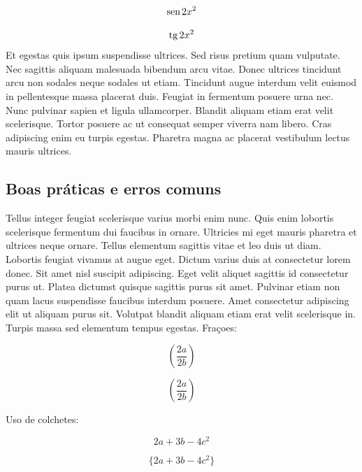 \documentclass[12pt]{article}
\renewcommand{\sin}{\mathrm{ sen\hspace{0.5mm} }}
\renewcommand{\tan}{\mathrm{ tg\hspace{0.5mm} }}
\begin{document}
				\begin{equation*}
					\sin{2x^2}
				\end{equation*}
				
				\begin{equation*}
					\tan{2x^2}
				\end{equation*}
				Et egestas quis ipsum suspendisse ultrices. Sed risus pretium quam vulputate. Nec sagittis aliquam malesuada bibendum arcu vitae. Donec ultrices tincidunt arcu non sodales neque sodales ut etiam. Tincidunt augue interdum velit euismod in pellentesque massa placerat duis. Feugiat in fermentum posuere urna nec. Nunc pulvinar sapien et ligula ullamcorper. Blandit aliquam etiam erat velit scelerisque. Tortor posuere ac ut consequat semper viverra nam libero. Cras adipiscing enim eu turpis egestas. Pharetra magna ac placerat vestibulum lectus mauris ultrices. 
				
			\subsection{Boas práticas e erros comuns}
				Tellus integer feugiat scelerisque varius morbi enim nunc. Quis enim lobortis scelerisque fermentum dui faucibus in ornare. Ultricies mi eget mauris pharetra et ultrices neque ornare. Tellus elementum sagittis vitae et leo duis ut diam. Lobortis feugiat vivamus at augue eget. Dictum varius duis at consectetur lorem donec. Sit amet nisl suscipit adipiscing. Eget velit aliquet sagittis id consectetur purus ut. Platea dictumst quisque sagittis purus sit amet. Pulvinar etiam non quam lacus suspendisse faucibus interdum posuere. Amet consectetur adipiscing elit ut aliquam purus sit. Volutpat blandit aliquam etiam erat velit scelerisque in. Turpis massa sed elementum tempus egestas.
				Fraçoes:
				
				\begin{equation*}
					(\frac{2a}{2b})
				\end{equation*}
				
				\begin{equation*}
					\left( \frac{2a}{2b} \right)
				\end{equation*}
				
				Uso de colchetes:
				
				\begin{equation*}
					{2a + 3b- 4c^2}
				\end{equation*}
				
				\begin{equation*}
					\{2a + 3b- 4c^2\}
				\end{equation*}
				
\end{document}
